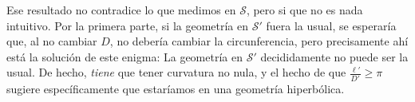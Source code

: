 \documentclass[a4paper,12pt]{article}
\begin{document}
Ese resultado no contradice lo que medimos en $\mathcal{S}$, pero si que no es nada intuitivo. Por la primera parte, si la geometría en $\mathcal{S}'$ fuera la usual, se esperaría que, al no cambiar $D$, no debería cambiar la circunferencia, pero precisamente ahí está la solución de este enigma: La geometría en $\mathcal{S}'$ decididamente no puede ser la usual. De hecho, \textit{tiene} que tener curvatura no nula, y el hecho de que $\frac{\ell'}{D'}\geq \pi$ sugiere específicamente que estaríamos en una geometría hiperbólica.
\end{document}
